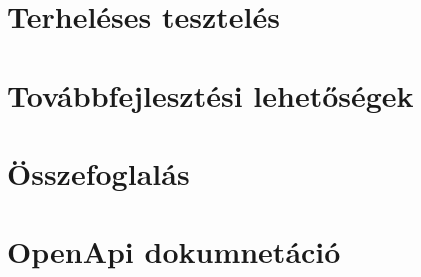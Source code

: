 \chapter{Terheléses tesztelés}
\pagestyle{main}



\chapter{Továbbfejlesztési lehetőségek}
\pagestyle{main}



\chapter*{Összefoglalás}\label{ch:osszefoglalas}
\pagestyle{plain}


\newpage






\appendix
\chapter{OpenApi dokumnetáció}\label{appendix:openapi}



